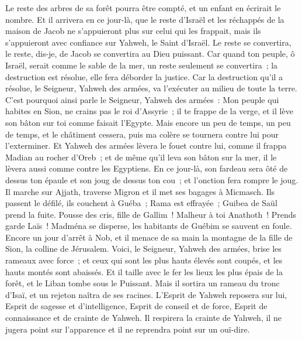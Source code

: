 \begin{multicols}{2}
Le reste des arbres de sa forêt pourra être compté, et un enfant en écrirait le nombre.
Et il arrivera en ce jour-là, que le reste d'Israël et les réchappés de la maison de Jacob ne s'appuieront plus sur celui qui les frappait, mais ils s'appuieront avec confiance sur Yahweh, le Saint d'Israël.
Le reste se convertira, le reste, dis-je, de Jacob se convertira au Dieu puissant.
Car quand ton peuple, ô Israël, serait comme le sable de la mer, un reste seulement se convertira~; la destruction est résolue, elle fera déborder la justice.
Car la destruction qu'il a résolue, le Seigneur, Yahweh des armées, va l'exécuter au milieu de toute la terre.
C'est pourquoi ainsi parle le Seigneur, Yahweh des armées~: Mon peuple qui habites en Sion, ne crains pas le roi d'Assyrie~; il te frappe de la verge, et il lève son bâton sur toi comme faisait l'Egypte.
Mais encore un peu de temps, un peu de temps, et le châtiment cessera, puis ma colère se tournera contre lui pour l'exterminer.
Et Yahweh des armées lèvera le fouet contre lui, comme il frappa Madian au rocher d'Oreb~; et de même qu'il leva son bâton sur la mer, il le lèvera aussi comme contre les Egyptiens.
En ce jour-là, son fardeau sera ôté de dessus ton épaule et son joug de dessus ton cou~; et l'onction fera rompre le joug.
Il marche sur Ajjath, traverse Migron et il met ses bagages à Micmasch.
Ils passent le défilé, ils couchent à Guéba~; Rama est effrayée~; Guibea de Saül prend la fuite.
Pousse des cris, fille de Gallim~! Malheur à toi Anathoth~! Prends garde Laïs~!
Madména se disperse, les habitants de Guébim se sauvent en foule.
Encore un jour d'arrêt à Nob, et il menace de sa main la montagne de la fille de Sion, la colline de Jérusalem.
Voici, le Seigneur, Yahweh des armées, brise les rameaux avec force~; et ceux qui sont les plus hauts élevés sont coupés, et les hauts montés sont abaissés.
Et il taille avec le fer les lieux les plus épais de la forêt, et le Liban tombe sous le Puissant.
\VerseOne{}Mais il sortira un rameau du tronc d'Isaï, et un rejeton naîtra de ses racines.
L'Esprit de Yahweh reposera sur lui, Esprit de sagesse et d'intelligence, Esprit de conseil et de force, Esprit de connaissance et de crainte de Yahweh.
Il respirera la crainte de Yahweh, il ne jugera point sur l'apparence et il ne reprendra point sur un ouï-dire.

\end{multicols}
